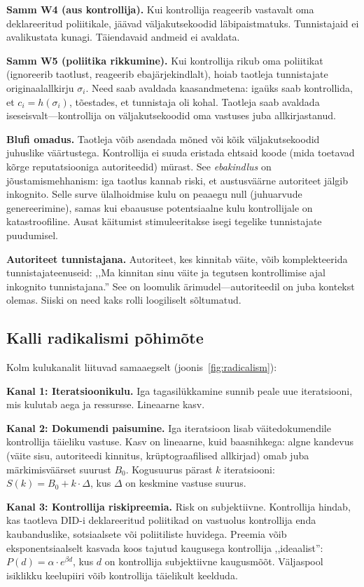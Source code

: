 \documentclass[11pt,a4paper,twocolumn]{article}
\begin{document}
\textbf{Samm W4 (aus kontrollija).} Kui kontrollija reageerib vastavalt oma deklareeritud poliitikale, jäävad väljakutsekoodid läbipaistmatuks. Tunnistajaid ei avalikustata kunagi. Täiendavaid andmeid ei avaldata.

\textbf{Samm W5 (poliitika rikkumine).} Kui kontrollija rikub oma poliitikat (ignoreerib taotlust, reageerib ebajärjekindlalt), hoiab taotleja tunnistajate originaalallkirju $\sigma_i$. Need saab avaldada kaasandmetena: igaüks saab kontrollida, et $c_i = h(\sigma_i)$, tõestades, et tunnistaja oli kohal. Taotleja saab avaldada iseseisvalt---kontrollija on väljakutsekoodid oma vastuses juba allkirjastanud.

\textbf{Blufi omadus.} Taotleja võib asendada mõned või kõik väljakutsekoodid juhuslike väärtustega. Kontrollija ei suuda eristada ehtsaid koode (mida toetavad kõrge reputatsiooniga autoriteedid) mürast. See \emph{ebakindlus} on jõustamismehhanism: iga taotlus kannab riski, et austusväärne autoriteet jälgib inkognito. Selle surve ülalhoidmise kulu on peaaegu null (juhuarvude genereerimine), samas kui ebaaususe potentsiaalne kulu kontrollijale on katastroofiline. Ausat käitumist stimuleeritakse isegi tegelike tunnistajate puudumisel.

\textbf{Autoriteet tunnistajana.} Autoriteet, kes kinnitab väite, võib komplekteerida tunnistajateenuseid: ,,Ma kinnitan sinu väite ja tegutsen kontrollimise ajal inkognito tunnistajana.'' See on loomulik ärimudel---autoriteedil on juba kontekst olemas. Siiski on need kaks rolli loogiliselt sõltumatud.

\subsection{Kalli radikalismi põhimõte}

Kolm kulukanalit liituvad samaaegselt (joonis~\ref{fig:radicalism}):

\textbf{Kanal 1: Iteratsioonikulu.} Iga tagasilükkamine sunnib peale uue iteratsiooni, mis kulutab aega ja ressursse. Lineaarne kasv.

\textbf{Kanal 2: Dokumendi paisumine.} Iga iteratsioon lisab väitedokumendile kontrollija täieliku vastuse. Kasv on lineaarne, kuid baasnihkega: algne kandevus (väite sisu, autoriteedi kinnitus, krüptograafilised allkirjad) omab juba märkimisväärset suurust $B_0$. Kogusuurus pärast $k$ iteratsiooni: $S(k) = B_0 + k \cdot \Delta$, kus $\Delta$ on keskmine vastuse suurus.

\textbf{Kanal 3: Kontrollija riskipreemia.} Risk on subjektiivne. Kontrollija hindab, kas taotleva DID-i deklareeritud poliitikad on vastuolus kontrollija enda kaubanduslike, sotsiaalsete või poliitiliste huvidega. Preemia võib eksponentsiaalselt kasvada koos tajutud kaugusega kontrollija ,,ideaalist'': $P(d) = \alpha \cdot e^{\beta d}$, kus $d$ on kontrollija subjektiivne kaugusmõõt. Väljaspool isiklikku keelupiiri võib kontrollija täielikult keelduda.
\end{document}
